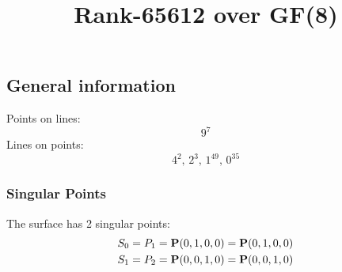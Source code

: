 \documentclass{article}
\newcommand\setTBstruts{\def\T{\rule{0pt}{2.6ex}}%
\def\B{\rule[-1.2ex]{0pt}{0pt}}}
\newcommand{\bP}{{\bf P}}
\begin{document}
 
\setTBstruts



{\allowdisplaybreaks%






\title{Rank-65612 over GF(8)}
\author{}%
\maketitle%
%
{}



\subsection*{General information}
Points on lines:
$$
9^7$$
Lines on points:
$$
4^2,\,2^3,\,1^{49},\,0^{35}$$
\subsubsection*{Singular Points}
The surface has 2 singular points:\\
\begin{align*}
S_{0} &= P_{1}=\bP(0, 1, 0, 0) = \bP(0, 1, 0, 0)\\
S_{1} &= P_{2}=\bP(0, 0, 1, 0) = \bP(0, 0, 1, 0)\\
\end{align*}
}
\end{document}
